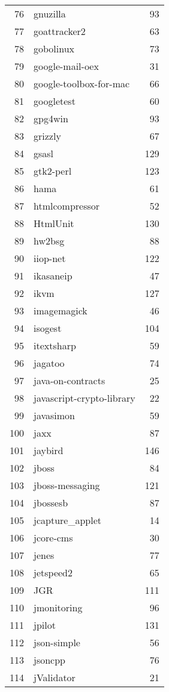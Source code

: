 \begin{table}[!ht]
\begin{tabular}{rlr}
  76 & gnuzilla &  93 \\ 
  77 & goattracker2 &  63 \\ 
  78 & gobolinux &  73 \\ 
  79 & google-mail-oex &  31 \\ 
  80 & google-toolbox-for-mac &  66 \\ 
  81 & googletest &  60 \\ 
  82 & gpg4win &  93 \\ 
  83 & grizzly &  67 \\ 
  84 & gsasl & 129 \\ 
  85 & gtk2-perl & 123 \\ 
  86 & hama &  61 \\ 
  87 & htmlcompressor &  52 \\ 
  88 & HtmlUnit & 130 \\ 
  89 & hw2bsg &  88 \\ 
  90 & iiop-net & 122 \\ 
  91 & ikasaneip &  47 \\ 
  92 & ikvm & 127 \\ 
  93 & imagemagick &  46 \\ 
  94 & isogest & 104 \\ 
  95 & itextsharp &  59 \\ 
  96 & jagatoo &  74 \\ 
  97 & java-on-contracts &  25 \\ 
  98 & javascript-crypto-library &  22 \\ 
  99 & javasimon &  59 \\ 
  100 & jaxx &  87 \\ 
  101 & jaybird & 146 \\ 
  102 & jboss &  84 \\ 
  103 & jboss-messaging & 121 \\ 
  104 & jbossesb &  87 \\ 
  105 & jcapture\_applet &  14 \\ 
  106 & jcore-cms &  30 \\ 
  107 & jenes &  77 \\ 
  108 & jetspeed2 &  65 \\ 
  109 & JGR & 111 \\ 
  110 & jmonitoring &  96 \\ 
  111 & jpilot & 131 \\ 
  112 & json-simple &  56 \\ 
  113 & jsoncpp &  76 \\ 
  114 & jValidator &  21 \\ 

\end{tabular}
\end{table}
